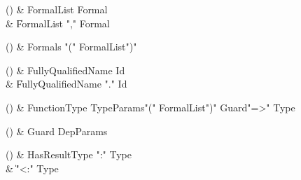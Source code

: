 \begin{bbgrammarappendix}

() & FormalList \label{prod:FormalList}  \: Formal  \\

 &    \| FormalList \xcd"," Formal \\

\end{bbgrammarappendix}

\begin{bbgrammarappendix}

() & Formals \label{prod:Formals}  \: \xcd"(" FormalList\opt \xcd")"  \\


\end{bbgrammarappendix}

\begin{bbgrammarappendix}

() & FullyQualifiedName \label{prod:FullyQualifiedName}  \: Id  \\

 &    \| FullyQualifiedName \xcd"." Id \\

\end{bbgrammarappendix}

\begin{bbgrammarappendix}

() & FunctionType \label{prod:FunctionType}  \: TypeParams\opt \xcd"(" FormalList\opt \xcd")" Guard\opt \xcd"=>" Type  \\


\end{bbgrammarappendix}

\begin{bbgrammarappendix}

() & Guard \label{prod:Guard}  \: DepParams  \\


\end{bbgrammarappendix}

\begin{bbgrammarappendix}

() & HasResultType \label{prod:HasResultType}  \: \xcd":" Type  \\

 &    \| \xcd"<:" Type \\

\end{bbgrammarappendix}

